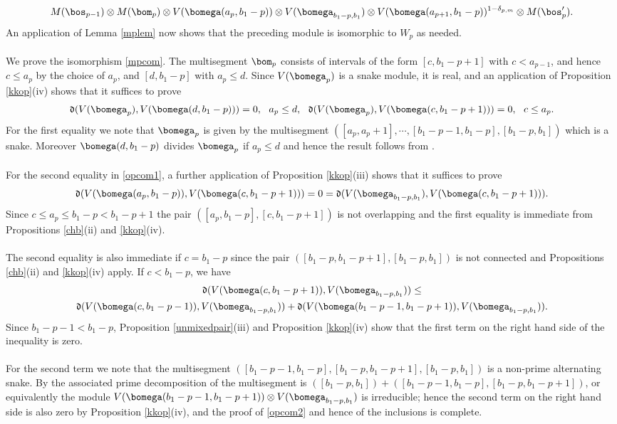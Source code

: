 \documentclass[11pt,reqno]{amsart}
\theoremstyle{definition} \newtheorem*{defn}{Definition}
\theoremstyle{definition}
\numberwithin{equation}{section}
\newcommand{\lie}[1]{\mathfrak{#1}}
\begin{document}
\begin{gather*}
 M(\bos_{p-1})\otimes M(\bom_p)\otimes V(\bomega(a_p,b_1-p))\otimes V(\bomega_{b_1-p,b_1})\otimes V(\bomega(a_{p+1},b_1-p))^{1-\delta_{p,m}}\otimes M(\bos'_p).
\end{gather*}
An application of Lemma \ref{mplem} now shows that the preceding module is isomorphic to $W_p$ as needed.
\\\\
We prove the isomorphism \eqref{mpcom}.
  The multisegment $\bom_p$ consists of intervals of the form $[c,b_1-p+1]$ with $c<a_{p-1}$, and hence $c\leq a_p$ by the choice of $a_p$, and $[d,b_1-p]$ with $a_p\leq d$. Since $V(\bomega_p)$ is a snake module, it is real, and an application of Proposition \ref{kkop}(iv) shows that it suffices to prove
\begin{gather}
\label{opcom1} \lie d (V(\bomega_p), V(\bomega(d,b_1-p)))=0, \ \  a_p\leq d,\ \
\lie d (V(\bomega_p), V(\bomega(c,b_1-p+1)))=0, \ \ c\leq a_p.
\end{gather}
 For the first equality    we note that  $\bomega_p$ is given by the multisegment $([a_p,a_p+1],\cdots,[b_1-p-1,b_1-p], [b_1-p,b_1])$ which is  a snake. Moreover $\bomega(d,b_1-p)$ divides $\bomega_p$ if $a_p\le d$ and hence the result follows from \cite[Proposition 4.1.3(ii)]{Naoi24}. \\\\
For the second equality in \eqref{opcom1}, a further application of Proposition \ref{kkop}(iii) shows that it suffices to prove
\begin{gather}\label{opcom2} \lie d (V(\bomega(a_p,b_1-p)), V(\bomega(c,b_1-p+1))) =0= \lie d (V(\bomega_{b_1-p,b_1}), V(\bomega(c,b_1-p+1))).\end{gather}
Since $c\leq a_p\leq b_1-p<b_1-p+1$ the pair $([a_p,b_1-p],[c,b_1-p+1])$ is not overlapping and the first equality is immediate from Propositions \ref{chb}(ii) and \ref{kkop}(iv).\\\\
 The second equality is also immediate if  $c=b_1-p$ since the pair $([b_1-p,b_1-p+1], [b_1-p,b_1])$ is not connected and  Propositions \ref{chb}(ii) and \ref{kkop}(iv) apply. If $c<b_1-p$, we have
\begin{gather*}
    \lie d (V(\bomega(c,b_1-p+1)), V(\bomega_{b_1-p,b_1}))\leq \\ \lie d (V(\bomega(c,b_1-p-1)), V(\bomega_{b_1-p,b_1})) + \lie d (V(\bomega(b_1-p-1,b_1-p+1)), V(\bomega_{b_1-p,b_1})).
\end{gather*}
Since $b_1-p-1<b_1-p$, Proposition \ref{unmixedpair}(iii) and Proposition \ref{kkop}(iv) show that the first term on the right hand side of the inequality is zero. \\\\
For the second term we note that the multisegment $([b_1-p-1, b_1-p], [b_1-p,b_1-p+1], [b_1-p,b_1])$ is a non-prime alternating snake.
By  \cite[Theorem 1]{BC25a} the associated prime decomposition of the multisegment is  $([b_1-p,b_1])+ ([b_1-p-1,b_1-p],[b_1-p,b_1-p+1])$, or equivalently the module $V(\bomega(b_1-p-1, b_1-p+1))\otimes V(\bomega_{b_1-p,b_1})$ is irreducible; hence the second term on the right hand side is also zero by Proposition \ref{kkop}(iv), and the proof of \eqref{opcom2} and hence of the inclusions is complete.
\end{document}

